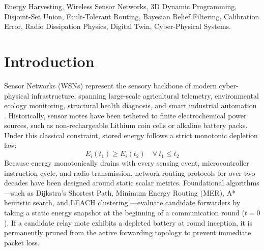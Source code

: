 \documentclass[journal]{IEEEtran}
\begin{document}
\begin{abstract}
The complete framework is validated through an exhaustive 75-test automated unit suite (100\% pass rate) and multi-seed Monte Carlo benchmarks ($N=30$ seeds, 350 rounds). Under severe solar scarcity, our belief-driven routing closes $81.5\%$ of the omniscient oracle delivery gap while reducing Expected Calibration Error from $0.039$ to $0.019$. In a real-world case study on the Great Duck Island habitat monitoring topology ($N=32$ motes, 60\% spruce canopy occlusion), our framework sustains 100\% mote survival with zero node deaths across 500 rounds (+15.5\% mission extension over LEACH). Finally, we demonstrate a production-grade full-stack Digital Twin platform (FastAPI + React 19) providing real-time SVG topology visualization with continuous 7-tier energy gradients, on-node charge badges, and micro-weather monitoring.
\end{abstract}

\begin{IEEEkeywords}
Energy Harvesting, Wireless Sensor Networks, 3D Dynamic Programming, Disjoint-Set Union, Fault-Tolerant Routing, Bayesian Belief Filtering, Calibration Error, Radio Dissipation Physics, Digital Twin, Cyber-Physical Systems.
\end{IEEEkeywords}

\section{Introduction}
 Sensor Networks (WSNs) represent the sensory backbone of modern cyber-physical infrastructure, spanning large-scale agricultural telemetry, environmental ecology monitoring, structural health diagnosis, and smart industrial automation \cite{akyildiz2002wireless, mainwaring2002wireless}. Historically, sensor motes have been tethered to finite electrochemical power sources, such as non-rechargeable Lithium coin cells or alkaline battery packs. Under this classical constraint, stored energy follows a strict monotonic depletion law:
\begin{equation}
E_i(t_1) \ge E_i(t_2) \quad \forall\ t_1 \le t_2
\label{eq:monotonicity}
\end{equation}
Because energy monotonically drains with every sensing event, microcontroller instruction cycle, and radio transmission, network routing protocols for over two decades have been designed around static scalar metrics. Foundational algorithms---such as Dijkstra's Shortest Path, Minimum Energy Routing (MER), A* heuristic search, and LEACH clustering \cite{heinzelman2000energy}---evaluate candidate forwarders by taking a static energy snapshot at the beginning of a communication round ($t=0$). If a candidate relay mote exhibits a depleted battery at round inception, it is permanently pruned from the active forwarding topology to prevent immediate packet loss.
\end{document}
